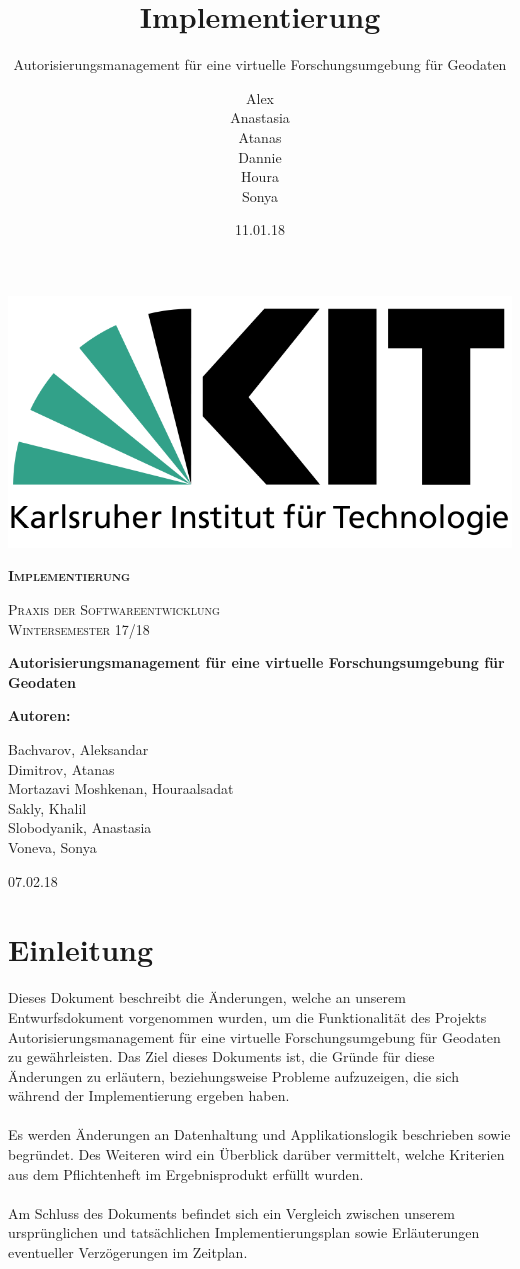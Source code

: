 \documentclass[parskip=full,11pt]{scrartcl}
\title{Implementierung}
\subtitle{Autorisierungsmanagement für eine virtuelle Forschungsumgebung für Geodaten}
\author{Alex\\Anastasia\\Atanas\\Dannie\\ Houra\\Sonya\\}
\date{11.01.18}
\begin{document}
 
 \begin{titlepage}
 	
 	\begin{center}
 	\includegraphics[width=0.5\linewidth]{res/KITLogo.png}\\
 	\vspace{2cm}
 	{\scshape\LARGE\bfseries Implementierung \par}
 	\vspace{0.5cm}
 	{\scshape\Large Praxis der Softwareentwicklung\\}
 	\vspace{1cm}
 	{\scshape\Large Wintersemester 17/18\\}
 	\vspace{2cm}
 	{\huge\bfseries Autorisierungsmanagement für eine virtuelle Forschungsumgebung für Geodaten\par}
 	\vspace{2cm}
 	\vfill
 	{\bfseries {\Large Autoren}:\par}
 	{\Large Bachvarov, Aleksandar }\\
 	{\Large Dimitrov, Atanas }\\
 	{\Large Mortazavi Moshkenan, Houraalsadat }\\
 	{\Large Sakly, Khalil }\\
 	{\Large Slobodyanik, Anastasia }\\
 	{\Large Voneva, Sonya}\\
 	\vfill
 	{\large 07.02.18 \par}
 	\end{center}
 \end{titlepage}
 
 \tableofcontents
 \newpage
 \section{Einleitung}
Dieses Dokument beschreibt die Änderungen, welche an unserem Entwurfsdokument vorgenommen wurden, um die Funktionalität des Projekts 	\glqq Autorisierungsmanagement für eine virtuelle Forschungsumgebung für Geodaten\grqq{} zu gewährleisten. Das Ziel dieses Dokuments ist, die Gründe für diese Änderungen zu erläutern, beziehungsweise Probleme aufzuzeigen, die sich während der Implementierung ergeben haben.\\\\
Es werden Änderungen an Datenhaltung und Applikationslogik beschrieben sowie begründet. Des Weiteren wird ein Überblick darüber vermittelt, welche Kriterien aus dem Pflichtenheft im Ergebnisprodukt erfüllt wurden.\\\\
Am Schluss des Dokuments befindet sich ein Vergleich zwischen unserem ursprünglichen und tatsächlichen Implementierungsplan sowie Erläuterungen eventueller Verzögerungen im Zeitplan.
\end{document}
